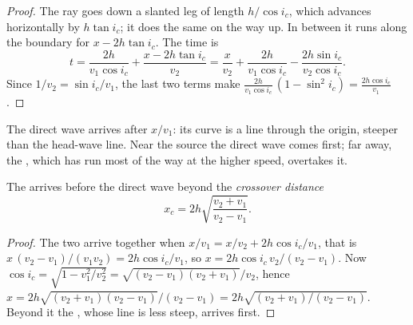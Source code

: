 \begin{proof}
The ray goes down a slanted leg of length $h/\cos i_c$, which advances
horizontally by $h\tan i_c$; it does the same on the way up. In between it
runs along the boundary for $x - 2h\tan i_c$. The time is
\[
  t = \frac{2h}{v_1\cos i_c} + \frac{x - 2h\tan i_c}{v_2}
    = \frac{x}{v_2} + \frac{2h}{v_1\cos i_c} - \frac{2h\sin i_c}{v_2\cos i_c}.
\]
Since $1/v_2 = \sin i_c/v_1$, the last two terms make
$\frac{2h}{v_1\cos i_c}\,(1 - \sin^2 i_c) = \frac{2h\cos i_c}{v_1}$.
\end{proof}

The direct wave arrives after $x/v_1$: its curve is a line through the
origin, steeper than the head-wave line. Near the source the direct wave comes
first; far away, the , which has run most of the way at the higher
speed, overtakes it.

\begin{proposition}\label{prop:g11:seismic-structure:crossover}
The  arrives before the direct wave beyond the \emph{crossover
distance}
\[
  x_c = 2h\sqrt{\frac{v_2 + v_1}{v_2 - v_1}}.
\]
\end{proposition}

\begin{proof}
The two arrive together when $x/v_1 = x/v_2 + 2h\cos i_c/v_1$, that is
$x\,(v_2 - v_1)/(v_1 v_2) = 2h\cos i_c/v_1$, so $x = 2h\cos i_c\,v_2/(v_2 -
v_1)$. Now $\cos i_c = \sqrt{1 - v_1^2/v_2^2} = \sqrt{(v_2 - v_1)(v_2 +
v_1)}/v_2$, hence $x = 2h\sqrt{(v_2 + v_1)(v_2 - v_1)}/(v_2 - v_1) =
2h\sqrt{(v_2 + v_1)/(v_2 - v_1)}$. Beyond it the , whose line is
less steep, arrives first.
\end{proof}

